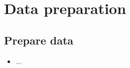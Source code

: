 \chapter{Data preparation}\label{sec:data-prep}

\section{Prepare data}
    \begin{itemize}
        \item ...
    \end{itemize}
